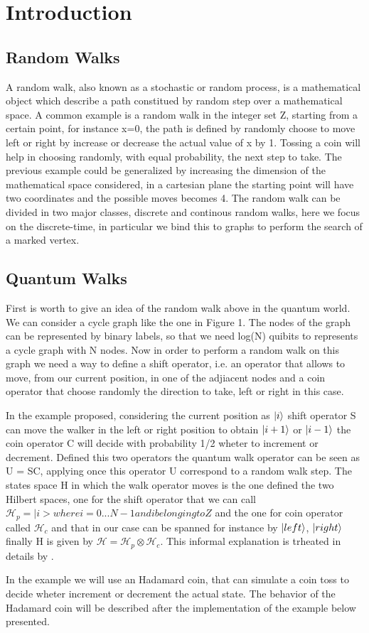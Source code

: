 \section{Introduction}
\subsection{Random Walks}
A random walk, also known as a stochastic or random process, is a mathematical object which describe a path constitued by random step over a mathematical space. A common 
example is a random walk in the integer set Z, starting from a certain point, for instance x=0, the path is defined by randomly choose to move left or right by increase 
or decrease the actual value of x by 1. Tossing a coin will help in choosing randomly, with equal probability, the next step to take. 
The previous example could be generalized by increasing the dimension of the mathematical space considered, in a cartesian plane the starting point will have two  
coordinates and the possible moves becomes 4.
The random walk can be divided in two major classes, discrete and continous random walks, here we focus on the discrete-time, in particular we bind this to graphs
to perform the search of a marked vertex.

\subsection{Quantum Walks}

First is worth to give an idea of the random walk above in the quantum world. We can consider a cycle graph like the one in Figure 1. The nodes of the graph can be 
represented by binary labels, so that we need log(N) quibits to represents a cycle graph with N nodes. Now in order to perform a random walk on this graph we need a
way to define a shift operator, i.e. an operator that allows to move, from our current position, in one of the adjiacent nodes and a coin operator that choose randomly
the direction to take, left or right in this case. 

In the example proposed, considering the current position as $\ket{i}$ shift operator S can move the walker in the left or right position to obtain $\ket{i+1}$ or $\ket{i-1}$ 
the coin operator C will decide with probability 1/2 wheter to increment or decrement. Defined this two operators 
the quantum walk operator can be seen as U = SC, applying once this operator U correspond to a random walk step.
The states space H in which the walk operator moves is the one defined the two Hilbert spaces, one for the shift operator that we can call 
$\mathcal{H}_{p} = {|i> where i = 0...N-1 and i belonging to Z}$ and the one for coin operator called $\mathcal{H}_{c}$ and that in our case can be spanned for instance by 
{$\ket{left}$, $\ket{right}$} finally H is given by $\mathcal{H}=\mathcal{H}_{p}\otimes\mathcal{H}_{c}$. This informal explanation is trheated in details by \cite{Kempe_2003}. 

In the example we will use an Hadamard coin, that can simulate a coin toss to decide wheter increment or decrement the actual state. The behavior of the Hadamard coin 
will be described after the implementation of the example below presented.


